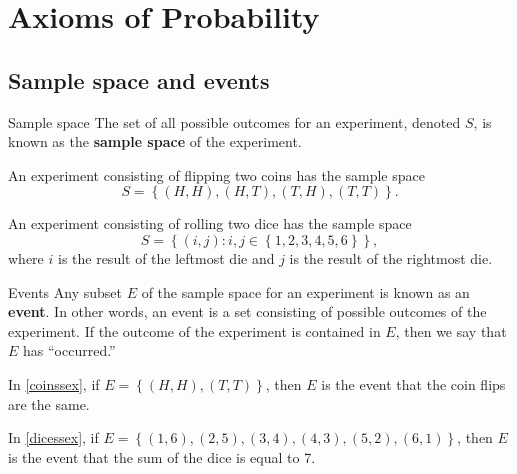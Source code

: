 \section{Axioms of Probability}
\subsection{Sample space and events}
\begin{bdef}{Sample space}
    The set of all possible outcomes for an experiment, denoted $S$, is known as the \textbf{sample space} of the experiment.
\end{bdef}

\begin{changebar}
    \begin{example}\label{coinssex}
        An experiment consisting of flipping two coins has the sample space \[
            S = \left\{ (H, H), (H, T), (T, H), (T, T) \right\}.    
            \]
        \end{example}
    \end{changebar}

\begin{changebar}
    \begin{example}\label{dicessex}
        An experiment consisting of rolling two dice has the sample space \[
            S = \left\{ (i, j): i, j \in \left\{ 1, 2, 3, 4, 5, 6 \right\} \right\},    
            \] where $i$ is the result of the leftmost die and $j$ is the result of the rightmost die.
    \end{example}
\end{changebar}
        
\begin{bdef}{Events}
    Any subset $E$ of the sample space for an experiment is known as an \textbf{event}. In other words, an event is a set consisting of possible outcomes of the experiment. If the outcome of the experiment is contained in $E$, then we say that $E$ has ``occurred.''
\end{bdef}

\begin{changebar}
    \begin{example}
        In \autoref{coinssex}, if $E = \left\{ (H, H), (T, T) \right\}$, then $E$ is the event that the coin flips are the same.
    \end{example}
\end{changebar}

\begin{changebar}
    \begin{example}
    In \autoref{dicessex}, if $E = \left\{ (1, 6), (2, 5), (3, 4), (4, 3), (5, 2), (6, 1) \right\}$, then $E$ is the event that the sum of the dice is equal to 7.
\end{example}
\end{changebar}

